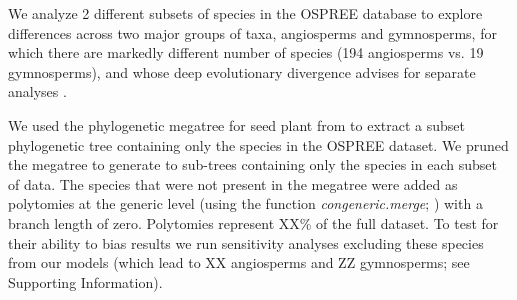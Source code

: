 \documentclass{article}\usepackage[]{graphicx}\usepackage[]{color}
\begin{document}
We analyze 2 different subsets of species in the OSPREE database to explore differences across two major groups of taxa, angiosperms and gymnosperms, for which there are markedly different number of species (194 angiosperms vs. 19 gymnosperms), and whose deep evolutionary divergence advises for separate analyses \citep{}.\\

We used the phylogenetic megatree for seed plant from \citet{smith2018constructing} to extract a subset phylogenetic tree containing only the species in the OSPREE dataset. We pruned the megatree to generate to sub-trees containing only the species in each subset of data. The species that were not present in the megatree were added as polytomies at the generic level (using the function \emph{congeneric.merge}; \citep{pearse2015pez}) with a branch length of zero. Polytomies represent XX\% of the full dataset. To test for their ability to bias results we run sensitivity analyses excluding these species from our models (which lead to XX angiosperms and ZZ gymnosperms; see Supporting Information). \\ 
\end{document}
